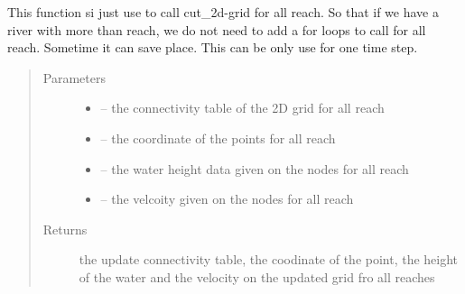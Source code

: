 \documentclass[letterpaper,10pt,english]{sphinxmanual}
\begin{document}
\begin{fulllineitems}
\label{\detokenize{index:src.manage_grid_8.cut_2d_grid_all_reach}}
This function si just use to call cut\_2d-grid for all reach. So that if we have a river with more than reach, we
do not need to add a for loops to call for all reach. Sometime it can save place. This can be only use for one
time step.
\begin{quote}\begin{description}
\item[{Parameters}] \leavevmode\begin{itemize}
\item {} 
 -- the connectivity table of the 2D grid for all reach

\item {} 
 -- the coordinate of the points for all reach

\item {} 
 -- the water height data given on the nodes for all reach

\item {} 
 -- the velcoity given on the nodes for all reach

\end{itemize}

\item[{Returns}] \leavevmode
the update connectivity table, the coodinate of the point, the height of the water and the
velocity on the updated grid fro all reaches

\end{description}\end{quote}

\end{fulllineitems}

\end{document}

